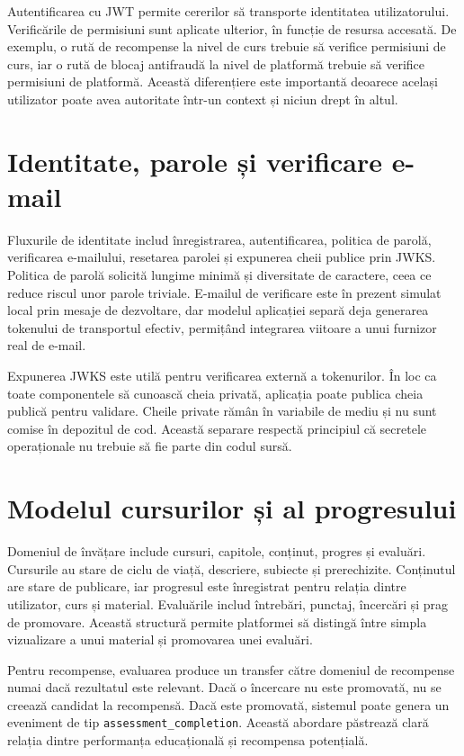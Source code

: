 Autentificarea cu JWT permite cererilor să transporte identitatea utilizatorului. Verificările de permisiuni sunt aplicate ulterior, în funcție de resursa accesată. De exemplu, o rută de recompense la nivel de curs trebuie să verifice permisiuni de curs, iar o rută de blocaj antifraudă la nivel de platformă trebuie să verifice permisiuni de platformă. Această diferențiere este importantă deoarece același utilizator poate avea autoritate într-un context și niciun drept în altul.

\section{Identitate, parole și verificare e-mail}
Fluxurile de identitate includ înregistrarea, autentificarea, politica de parolă, verificarea e-mailului, resetarea parolei și expunerea cheii publice prin JWKS. Politica de parolă solicită lungime minimă și diversitate de caractere, ceea ce reduce riscul unor parole triviale. E-mailul de verificare este în prezent simulat local prin mesaje de dezvoltare, dar modelul aplicației separă deja generarea tokenului de transportul efectiv, permițând integrarea viitoare a unui furnizor real de e-mail.

Expunerea JWKS este utilă pentru verificarea externă a tokenurilor. În loc ca toate componentele să cunoască cheia privată, aplicația poate publica cheia publică pentru validare. Cheile private rămân în variabile de mediu și nu sunt comise în depozitul de cod. Această separare respectă principiul că secretele operaționale nu trebuie să fie parte din codul sursă.

\section{Modelul cursurilor și al progresului}
Domeniul de învățare include cursuri, capitole, conținut, progres și evaluări. Cursurile au stare de ciclu de viață, descriere, subiecte și prerechizite. Conținutul are stare de publicare, iar progresul este înregistrat pentru relația dintre utilizator, curs și material. Evaluările includ întrebări, punctaj, încercări și prag de promovare. Această structură permite platformei să distingă între simpla vizualizare a unui material și promovarea unei evaluări.

Pentru recompense, evaluarea produce un transfer către domeniul de recompense numai dacă rezultatul este relevant. Dacă o încercare nu este promovată, nu se creează candidat la recompensă. Dacă este promovată, sistemul poate genera un eveniment de tip \texttt{assessment\_completion}. Această abordare păstrează clară relația dintre performanța educațională și recompensa potențială.

